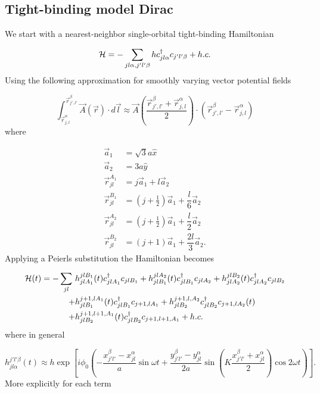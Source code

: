 \subsection{Tight-binding model Dirac}

We start with a nearest-neighbor single-orbital tight-binding Hamiltonian

\begin{equation}
  \mathcal{H} = - \sum_{jl\alpha,j'l'\beta} h c^{\dagger}_{jl\alpha} c_{j'l'\beta} + h.c.
\end{equation}
Using the following approximation for smoothly varying vector potential fields

\begin{equation}
  \int_{\vec{r}_{j,l}^{\alpha}} ^{\vec{r}_{j',l'}^{\beta}} \vec{A}(\vec{r}) \cdot d\vec{l} \approx \vec{A} \left( \dfrac{ \vec{r}_{j',l'}^{\beta} + \vec{r}_{j,l}^{\alpha} }{2} \right) \cdot \left( \vec{r}_{j',l'}^{\beta} - \vec{r}_{j,l}^{\alpha} \right)
\end{equation}
where

\begin{align}
  \vec{a}_1 &= \sqrt{3}a\hat{x} \\
  \vec{a}_2 &= 3a\hat{y} \\
  \vec{r}_{jl}^{A_1} &= j\vec{a}_1 + l\vec{a}_2 \\
  \vec{r}_{jl}^{B_1} &= (j+\tfrac{1}{2})\vec{a}_1 + \dfrac{l}{6}\vec{a}_2 \\
  \vec{r}_{jl}^{A_2} &= (j+\tfrac{1}{2})\vec{a}_1 + \dfrac{l}{2}\vec{a}_2 \\
  \vec{r}_{jl}^{B_2} &= (j+1)\vec{a}_1 + \dfrac{2l}{3}\vec{a}_2.
\end{align}
Applying a Peierls substitution the Hamiltonian becomes

\begin{equation}
\begin{split}
  \mathcal{H} (t) = -\sum_{jl} \ &h_{jlA_1}^{jlB_1}(t) c^{\dagger}_{jlA_1} c_{jlB_1} + h_{jlB_1}^{jlA_2}(t) c^{\dagger}_{jlB_1} c_{jlA_2} + h_{jlA_2}^{jlB_2}(t) c^{\dagger}_{jlA_2} c_{jlB_2} \\
      + &h_{jlB_1}^{j+1,lA_1}(t) c^{\dagger}_{jlB_1} c_{j+1,lA_1} + h_{jlB_2}^{j+1,l,A_2} c^{\dagger}_{jlB_2} c_{j+1,lA_2}(t) \\
      + &h_{jlB_2}^{j+1,l+1,A_1}(t) c^{\dagger}_{jlB_2} c_{j+1,l+1,A_1} + h.c.
\end{split}
\end{equation}
where in general

\begin{equation}
  h_{jl\alpha}^{j'l'\beta} (t) \approx h \exp \left[ i \phi_0 \left(-\dfrac{x_{j'l'}^{\beta} - x_{jl}^{\alpha}}{a} \sin\omega t + \dfrac{y_{j'l'}^{\beta} - y_{jl}^{\alpha}}{2a} \sin\left(K \dfrac{x_{j'l'}^{\beta} + x_{jl}^{\alpha}}{2}\right) \cos 2\omega t \right) \right].
\end{equation}
More explicitly for each term


